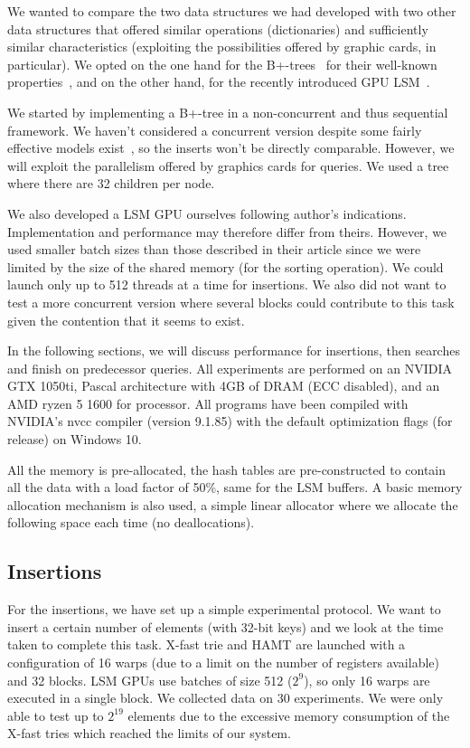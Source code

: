 \documentclass[conference]{IEEEtran}
\begin{document}
We wanted to compare the two data structures we had developed with two other data structures that offered similar operations (dictionaries) and sufficiently similar characteristics (exploiting the possibilities offered by graphic cards, in particular). We opted on the one hand for the B+-trees~\cite{fix2011accelerating} for their well-known properties~\cite{bender2005cache}, and on the other hand, for the recently introduced GPU LSM~\cite{ashkiani2017gpu}.

We started by implementing a B+-tree in a non-concurrent and thus sequential framework. We haven't considered a concurrent version despite some fairly effective models exist~\cite{braginsky2012lock}, so the inserts won't be directly comparable. However, we will exploit the parallelism offered by graphics cards for queries. We used a tree where there are 32 children per node.

We also developed a LSM GPU ourselves following author's indications. Implementation and performance may therefore differ from theirs. However, we used smaller batch sizes than those described in their article since we were limited by the size of the shared memory (for the sorting operation). We could launch only up to 512 threads at a time for insertions. We also did not want to test a more concurrent version where several blocks could contribute to this task given the contention that it seems to exist.

In the following sections, we will discuss performance for insertions, then searches and finish on predecessor queries. All experiments are performed on an NVIDIA GTX 1050ti, Pascal architecture with 4GB of DRAM (ECC disabled), and an AMD ryzen 5 1600 for processor. All programs have been compiled with NVIDIA's nvcc compiler (version 9.1.85) with the default optimization flags (for release) on Windows 10.

All the memory is pre-allocated, the hash tables are pre-constructed to contain all the data with a load factor of 50\%, same for the LSM buffers. A basic memory allocation mechanism is also used, a simple linear allocator where we allocate the following space each time (no deallocations).

\subsection{Insertions}

For the insertions, we have set up a simple experimental protocol. We want to insert a certain number of elements (with 32-bit keys) and we look at the time taken to complete this task. X-fast trie and HAMT are launched with a configuration of 16 warps (due to a limit on the number of registers available) and 32 blocks. LSM GPUs use batches of size 512 ($2^{9}$), so only 16 warps are executed in a single block. We collected data on 30 experiments. We were only able to test up to $2^{19}$ elements due to the excessive memory consumption of the X-fast tries which reached the limits of our system.
\end{document}
